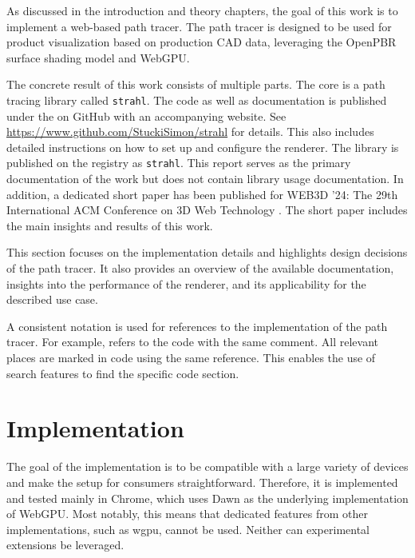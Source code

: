 
As discussed in the introduction and theory chapters, the goal of this work is to implement a web-based path tracer. The path tracer is designed to be used for product visualization based on production \gls{CAD} data, leveraging the \gls{OpenPBR} surface shading model and \gls{WebGPU}.

The concrete result of this work consists of multiple parts. The core is a path tracing library called \texttt{strahl}. The code as well as documentation is published under the  on GitHub with an accompanying website. See \url{https://www.github.com/StuckiSimon/strahl} for details. This also includes detailed instructions on how to set up and configure the renderer. The library is published on the  registry as \texttt{strahl}. This report serves as the primary documentation of the work but does not contain library usage documentation. In addition, a dedicated short paper has been published for WEB3D '24: The 29th International ACM Conference on 3D Web Technology \cite{ownShortPaper}. The short paper includes the main insights and results of this work.

This section focuses on the implementation details and highlights design decisions of the path tracer. It also provides an overview of the available documentation, insights into the performance of the renderer, and its applicability for the described use case.

A consistent notation is used for references to the implementation of the path tracer. For example,  refers to the code with the same comment. All relevant places are marked in code using the same reference. This enables the use of search features to find the specific code section.

\section{Implementation}

The goal of the implementation is to be compatible with a large variety of devices and make the setup for consumers straightforward. Therefore, it is implemented and tested mainly in Chrome, which uses \gls{Dawn} as the underlying implementation of \gls{WebGPU}. Most notably, this means that dedicated features from other implementations, such as \gls{wgpu}, cannot be used. Neither can experimental extensions be leveraged.


